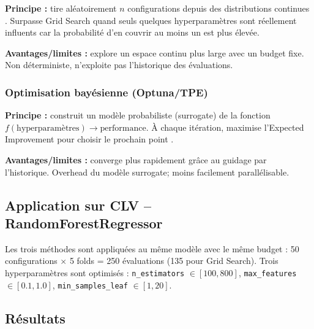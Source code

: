 \documentclass[11pt,a4paper]{article}
\newcommand{\code}[1]{\texttt{\small #1}}
\begin{document}
\textbf{Principe :} tire aléatoirement $n$ configurations depuis des
distributions continues \parencite{bergstra2012}. Surpasse Grid Search
quand seuls quelques hyperparamètres sont réellement influents car la
probabilité d'en couvrir au moins un est plus élevée.

\textbf{Avantages/limites :} explore un espace continu plus large avec un
budget fixe. Non déterministe, n'exploite pas l'historique des évaluations.

\subsubsection{Optimisation bayésienne (Optuna/TPE)}

\textbf{Principe :} construit un modèle probabiliste (surrogate) de la
fonction $f(\text{hyperparamètres}) \to \text{performance}$. À chaque
itération, maximise l'Expected Improvement pour choisir le prochain point
\parencite{akiba2019}.

\textbf{Avantages/limites :} converge plus rapidement grâce au guidage par
l'historique. Overhead du modèle surrogate; moins facilement
parallélisable.

\subsection{Application sur CLV -- RandomForestRegressor}

Les trois méthodes sont appliquées au même modèle avec le même budget :
50 configurations $\times$ 5 folds = 250 évaluations (135 pour Grid
Search). Trois hyperparamètres sont optimisés :
\code{n\_estimators} $\in [100, 800]$,
\code{max\_features} $\in [0.1, 1.0]$,
\code{min\_samples\_leaf} $\in [1, 20]$.

\subsection{Résultats}
\end{document}
